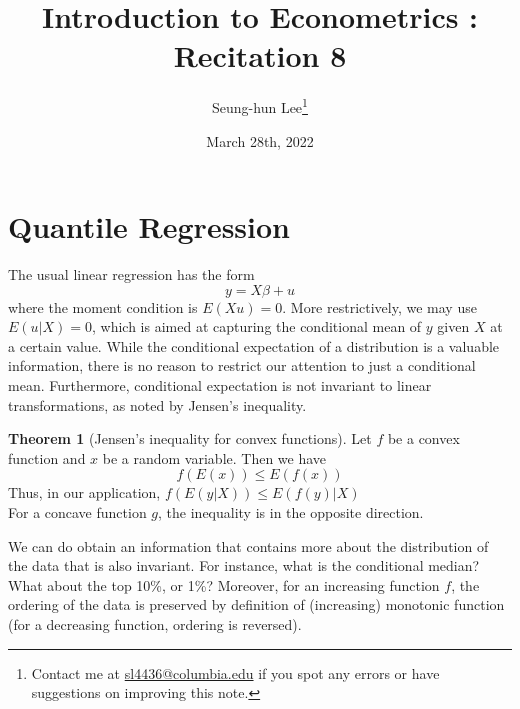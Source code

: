 \documentclass[12pt]{article}
\title{Introduction to Econometrics \ROM{2}: Recitation 8}
\theoremstyle{definition}
\theoremstyle{property}
\theoremstyle{assumption}
\theoremstyle{example}
\theoremstyle{comment}
\newtheorem{theorem}{Theorem}[section]
\begin{document}
\linespread{1.25}
\onehalfspacing

\author{Seung-hun Lee\footnote{Contact me at \href{mailto:sl4436@columbia.edu}{sl4436@columbia.edu} if you spot any errors or have suggestions on improving this note.}}
\date{March 28th, 2022}
\maketitle
\thispagestyle{firstpage}


\section{Quantile Regression}
The usual linear regression has the form
\[
y= X\beta+u
\]
where the moment condition is $E(Xu)=0$. More restrictively, we may use $E(u|X)=0$, which is aimed at capturing the conditional mean of $y$ given $X$ at a certain value. While the conditional expectation of a distribution is a valuable information, there is no reason to restrict our attention to just a conditional mean. Furthermore, conditional expectation is not invariant to linear transformations, as noted by Jensen's inequality. 
\begin{mdframed}[backgroundcolor=green!5] 
\begin{theorem}[Jensen's inequality for convex functions] Let $f$ be a convex function and $x$ be a random variable. Then we have
\[
f(E(x))\leq E(f(x))
\]
Thus, in our application, $f(E(y|X))\leq E(f(y)|X)$ \\
For a concave function $g$, the inequality is in the opposite direction. 
\end{theorem}
\end{mdframed} \par
We can do obtain an information that contains more about the distribution of the data that is also invariant. For instance, what is the conditional median? What about the top 10\%,  or 1\%? Moreover, for an increasing function $f$, the ordering of the data is preserved by definition of (increasing) monotonic function (for a decreasing function, ordering is reversed). 
\end{document}
